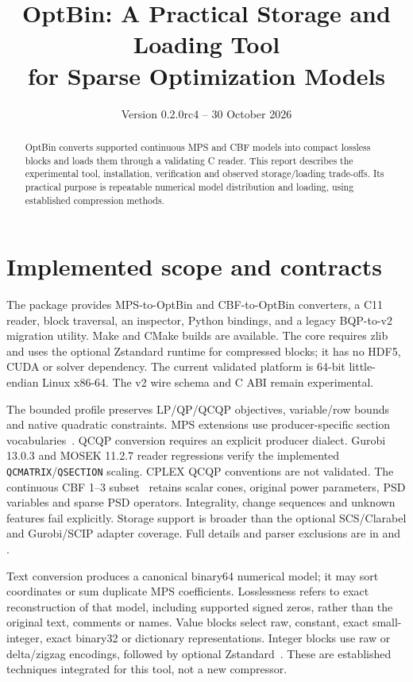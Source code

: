 \documentclass[10pt]{article}
\title{OptBin: A Practical Storage and Loading Tool\\for Sparse Optimization Models}
\author{}
\date{Version 0.2.0rc4 -- 30 October 2026}
\begin{document}
\maketitle
\begin{abstract}
OptBin converts supported continuous MPS and CBF models into compact lossless
blocks and loads them through a validating C reader. This report describes the
experimental tool, installation, verification and observed storage/loading
trade-offs. Its practical purpose is repeatable numerical model distribution
and loading, using established compression methods.
\end{abstract}

\section{Implemented scope and contracts}
The package provides MPS-to-OptBin and CBF-to-OptBin converters, a C11 reader,
block traversal, an inspector, Python bindings, and a legacy BQP-to-v2 migration
utility. Make and CMake builds are available. The core requires zlib and uses
the optional Zstandard runtime for compressed blocks; it has no HDF5, CUDA or
solver dependency. The current validated platform is 64-bit little-endian
Linux x86-64. The v2 wire schema and C ABI remain experimental.

The bounded profile preserves LP/QP/QCQP objectives, variable/row bounds and
native quadratic constraints. MPS extensions use producer-specific section
vocabularies~\cite{gurobi,mosek}. QCQP conversion requires an explicit producer
dialect. Gurobi 13.0.3 and MOSEK 11.2.7 reader regressions verify the implemented
\texttt{QCMATRIX}/\texttt{QSECTION} scaling. CPLEX QCQP conventions are not
validated. The continuous CBF 1--3 subset~\cite{cbf} retains scalar cones, original power
parameters, PSD variables and sparse PSD operators. Integrality, change
sequences and unknown features fail explicitly. Storage support is broader than
the optional SCS/Clarabel and Gurobi/SCIP adapter coverage. Full details and
parser exclusions are in  and .

Text conversion produces a canonical binary64 numerical model; it may sort
coordinates or sum duplicate MPS coefficients. Losslessness refers to exact
reconstruction of that model, including supported signed zeros, rather than
the original text, comments or names. Value blocks select raw, constant, exact
small-integer, exact binary32 or dictionary representations. Integer blocks
use raw or delta/zigzag encodings, followed by optional Zstandard~\cite{zstd}. These are
established techniques integrated for this tool, not a new compressor.
\end{document}
